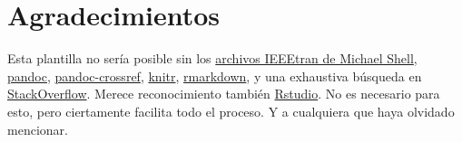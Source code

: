\documentclass[a4paper,conference]{IEEEtran}
\begin{document}
\section*{Agradecimientos}\label{sec:agradecimientos}

Esta plantilla no sería posible sin los
\href{https://www.ctan.org/tex-archive/macros/latex/contrib/IEEEtran/?lang=en}{archivos
IEEEtran de Michael Shell}, \href{http://pandoc.org/}{pandoc},
\href{https://github.com/lierdakil/pandoc-crossref}{pandoc-crossref},
\href{http://yihui.name/knitr/}{knitr},
\href{http://rmarkdown.rstudio.com/}{rmarkdown}, y una exhaustiva
búsqueda en \href{http://stackoverflow.com/}{StackOverflow}. Merece
reconocimiento también \href{https://www.rstudio.com/}{Rstudio}. No es
necesario para esto, pero ciertamente facilita todo el proceso. Y a
cualquiera que haya olvidado mencionar.


\end{document}

